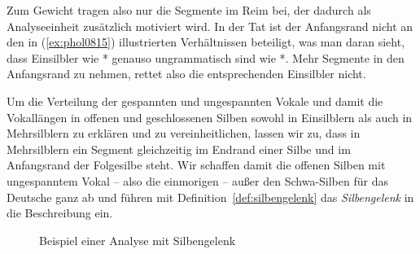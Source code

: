 Zum Gewicht tragen also nur die Segmente im Reim bei, der dadurch als Analyseeinheit zusätzlich motiviert wird.
In der Tat ist der Anfangsrand nicht an den in (\ref{ex:phol0815}) illustrierten Verhältnissen beteiligt, was man daran sieht, dass Einsilbler wie *\textipa{[knI]} genauso ungrammatisch sind wie *\textipa{[kI]}.
Mehr Segmente in den Anfangsrand zu nehmen, rettet also die entsprechenden Einsilbler nicht.

Um die Verteilung der gespannten und ungespannten Vokale und damit die Vokallängen in offenen und geschlossenen Silben sowohl in Einsilblern als auch in Mehrsilblern zu erklären und zu vereinheitlichen, lassen wir zu, dass in Mehrsilblern ein Segment gleichzeitig im Endrand einer Silbe und im Anfangsrand der Folgesilbe steht.
Wir schaffen damit die offenen Silben mit ungespanntem Vokal -- also die einmorigen -- außer den Schwa-Silben für das Deutsche ganz ab und führen mit Definition~\ref{def:silbengelenk} das \textit{Silbengelenk} in die Beschreibung ein.


\begin{figure}[!htbp]
  \centering
  \caption{Beispiel einer Analyse mit Silbengelenk}
  \label{fig:silbgel001}
\end{figure}

